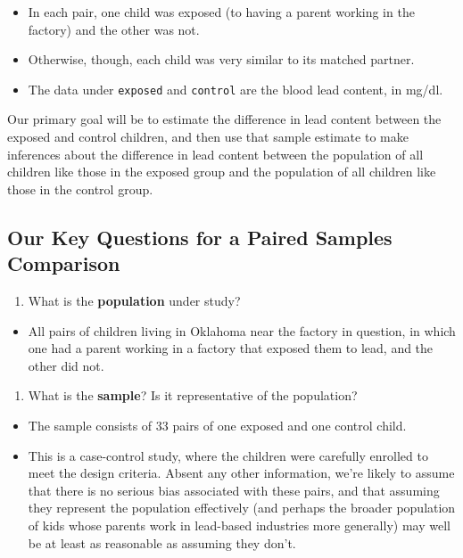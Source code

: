 \documentclass[
]{book}
\providecommand{\tightlist}{%
  \setlength{\itemsep}{0pt}\setlength{\parskip}{0pt}}
\begin{document}
\begin{itemize}
\tightlist
\item
  In each pair, one child was exposed (to having a parent working in the factory) and the other was not.
\item
  Otherwise, though, each child was very similar to its matched partner.
\item
  The data under \texttt{exposed} and \texttt{control} are the blood lead content, in mg/dl.
\end{itemize}

Our primary goal will be to estimate the difference in lead content between the exposed and control children, and then use that sample estimate to make inferences about the difference in lead content between the population of all children like those in the exposed group and the population of all children like those in the control group.

\hypertarget{our-key-questions-for-a-paired-samples-comparison}{%
\subsection{Our Key Questions for a Paired Samples Comparison}\label{our-key-questions-for-a-paired-samples-comparison}}

\begin{enumerate}
\def\labelenumi{\arabic{enumi}.}
\tightlist
\item
  What is the \textbf{population} under study?
\end{enumerate}

\begin{itemize}
\tightlist
\item
  All pairs of children living in Oklahoma near the factory in question, in which one had a parent working in a factory that exposed them to lead, and the other did not.
\end{itemize}

\begin{enumerate}
\def\labelenumi{\arabic{enumi}.}
\setcounter{enumi}{1}
\tightlist
\item
  What is the \textbf{sample}? Is it representative of the population?
\end{enumerate}

\begin{itemize}
\tightlist
\item
  The sample consists of 33 pairs of one exposed and one control child.
\item
  This is a case-control study, where the children were carefully enrolled to meet the design criteria. Absent any other information, we're likely to assume that there is no serious bias associated with these pairs, and that assuming they represent the population effectively (and perhaps the broader population of kids whose parents work in lead-based industries more generally) may well be at least as reasonable as assuming they don't.
\end{itemize}
\end{document}
